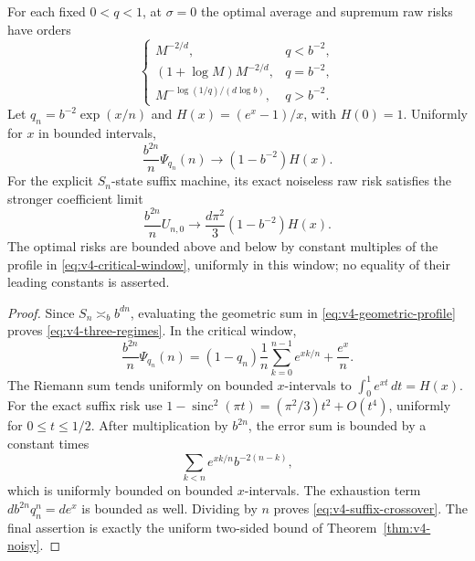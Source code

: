 \begin{corollary}\label{cor:v4-critical}
For each fixed $0<q<1$, at $\sigma=0$ the optimal average and
supremum raw risks have orders
\begin{equation}
 \begin{cases}
 M^{-2/d},&q<b^{-2},\\
 (1+\log M)M^{-2/d},&q=b^{-2},\\
 M^{-\log(1/q)/(d\log b)},&q>b^{-2}.
 \end{cases}                                                    \label{eq:v4-three-regimes}
\end{equation}
Let $q_n=b^{-2}\exp(x/n)$ and
$H(x)=(e^x-1)/x$, with $H(0)=1$. Uniformly for $x$ in bounded
intervals,
\begin{equation}
 \frac{b^{2n}}n\Psi_{q_n}(n)
 \longrightarrow (1-b^{-2})H(x).                               \label{eq:v4-critical-window}
\end{equation}
For the explicit $S_n$-state suffix machine, its exact noiseless raw
risk satisfies the stronger coefficient limit
\begin{equation}
 \frac{b^{2n}}n U_{n,0}
 \longrightarrow \frac{d\pi^2}{3}(1-b^{-2})H(x).                 \label{eq:v4-suffix-crossover}
\end{equation}
The optimal risks are bounded above and below by constant multiples
of the profile in \eqref{eq:v4-critical-window}, uniformly in this
window; no equality of their leading constants is asserted.
\end{corollary}
\begin{proof}
Since $S_n\asymp_b b^{dn}$, evaluating the geometric sum in
\eqref{eq:v4-geometric-profile} proves
\eqref{eq:v4-three-regimes}. In the critical window,
\[
 \frac{b^{2n}}n\Psi_{q_n}(n)
 =(1-q_n)\frac1n\sum_{k=0}^{n-1}e^{xk/n}+\frac{e^x}{n}.
\]
The Riemann sum tends uniformly on bounded $x$-intervals to
$\int_0^1e^{xt}\,dt=H(x)$.
For the exact suffix risk use
$1-\operatorname{sinc}^2(\pi t)=(\pi^2/3)t^2+O(t^4)$,
uniformly for $0\le t\le1/2$. After multiplication by $b^{2n}$,
the error sum is bounded by a constant times
\[
 \sum_{k<n}e^{xk/n}b^{-2(n-k)},
\]
which is uniformly bounded on bounded $x$-intervals.
The exhaustion term $db^{2n}q_n^n=de^x$ is bounded as well.
Dividing by $n$ proves \eqref{eq:v4-suffix-crossover}.
The final assertion is exactly the uniform two-sided bound of
Theorem~\ref{thm:v4-noisy}.
\end{proof}

